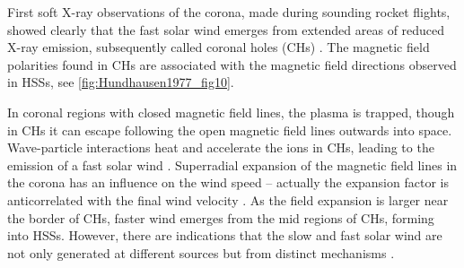 First soft X-ray observations of the corona, made during sounding rocket flights, showed clearly that the fast solar wind emerges from extended areas of reduced X-ray emission, subsequently called coronal holes (CHs) \citep{Krieger1973,Hundhausen1977}. The magnetic field polarities found in CHs are associated with the magnetic field directions observed in HSSs, see \autoref{fig:Hundhausen1977_fig10}.
\begin{figure}[htb]
\end{figure}
In coronal regions with closed magnetic field lines, the plasma is trapped, though in CHs it can escape following the open magnetic field lines outwards into space. Wave-particle interactions heat and accelerate the ions in CHs, leading to the emission of a fast solar wind \citep{Hollweg2002}. Superradial expansion of the magnetic field lines in the corona has an influence on the wind speed -- actually the expansion factor is anticorrelated with the final wind velocity \citep{Wang1990}. As the field expansion is larger near the border of CHs, faster wind emerges from the mid regions of CHs, forming into HSSs. However, there are indications that the slow and fast solar wind are not only generated at different sources but from distinct mechanisms \citep{McGregor2011b}.

